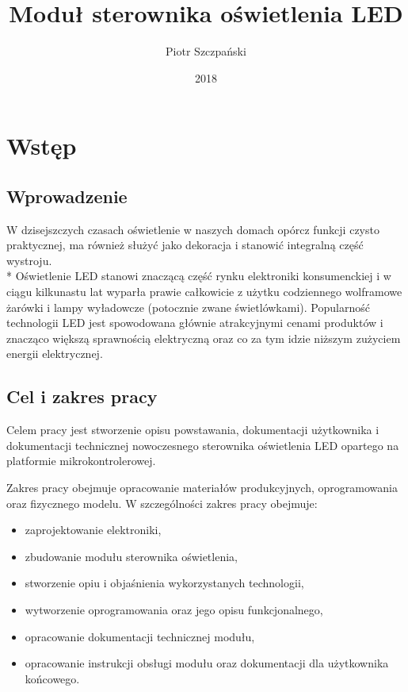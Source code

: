 \documentclass[12pt, eng, twoside, openany, final]{mgr}
\author{Piotr Szczpański}
\title{Moduł sterownika oświetlenia LED}
\date{2018}
\begin{document}
\maketitle
\tableofcontents
\listoffigures
\newpage

\pagestyle{fancy}
\fancyhead{} 
\fancyfoot{} 
\rfoot{\thepage}


\chapter{Wstęp}
\thispagestyle{fancy}
    \section{Wprowadzenie}
    W dzisejszczych czasach oświetlenie w naszych domach opórcz funkcji czysto praktycznej, ma również służyć jako dekoracja i stanowić integralną część wystroju. \\*
    Oświetlenie LED stanowi znaczącą część rynku elektroniki konsumenckiej i w ciągu kilkunastu lat wyparła prawie całkowicie z użytku codziennego wolframowe żarówki i lampy wyładowcze (potocznie zwane świetlówkami). Popularność technologii LED jest spowodowana głównie atrakcyjnymi cenami produktów i znacząco większą sprawnością elektryczną oraz co za tym idzie niższym zużyciem energii elektrycznej.
    
    \section{Cel i zakres pracy}
    Celem pracy jest stworzenie opisu powstawania, dokumentacji użytkownika i dokumentacji technicznej nowoczesnego sterownika oświetlenia LED opartego na platformie mikrokontrolerowej.
    
    Zakres pracy obejmuje opracowanie materiałów produkcyjnych, oprogramowania oraz fizycznego modelu. W szczególności zakres pracy obejmuje: 
    \begin{itemize}
        \item zaprojektowanie elektroniki, 
        \item zbudowanie modułu sterownika oświetlenia,
        \item stworzenie opiu i objaśnienia wykorzystanych technologii,
        \item wytworzenie oprogramowania oraz jego opisu funkcjonalnego,
        \item opracowanie dokumentacji technicznej modułu,
        \item opracowanie instrukcji obsługi modułu oraz dokumentacji dla użytkownika końcowego.
    \end{itemize}
%
\end{document}
